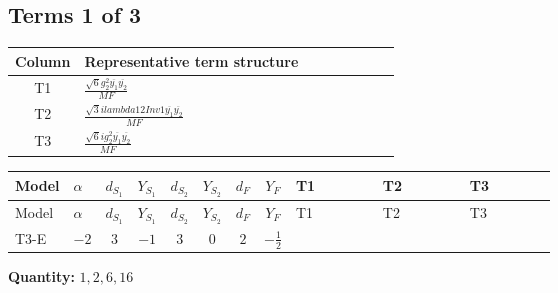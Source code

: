 \documentclass[8pt]{article}
\begin{document}
\begin{landscape}
\subsection*{Terms 1 of 3}
\begin{center}
\begin{tabular}{@{}c >{\raggedright\arraybackslash}p{0.82\linewidth}@{}}
\toprule
Column & Representative term structure \\
\midrule
T1 & \(\displaystyle \frac{\sqrt{6} g_{2}^{2} \overline{y_{1}} \overline{y_{2}}}{MF}\) \\
\midrule
T2 & \(\displaystyle \frac{\sqrt{3} i lambda12Inv1 \overline{y_{1}} \overline{y_{2}}}{MF}\) \\
\midrule
T3 & \(\displaystyle \frac{\sqrt{6} i g_{2}^{2} \overline{y_{1}} \overline{y_{2}}}{MF}\) \\
\midrule
\bottomrule
\end{tabular}
\end{center}
\smallskip
\tiny
\begin{longtable}{@{}llcccccc >{\raggedright\arraybackslash}p{0.21\linewidth} >{\raggedright\arraybackslash}p{0.21\linewidth} >{\raggedright\arraybackslash}p{0.21\linewidth}@{}}
\toprule
Model & $\alpha$ & $d_{S_1}$ & $Y_{S_1}$ & $d_{S_2}$ & $Y_{S_2}$ & $d_F$ & $Y_F$ & T1 & T2 & T3 \\
\midrule
\endfirsthead
\toprule
Model & $\alpha$ & $d_{S_1}$ & $Y_{S_1}$ & $d_{S_2}$ & $Y_{S_2}$ & $d_F$ & $Y_F$ & T1 & T2 & T3 \\
\midrule
\endhead
T3-E & $-2$ & $3$ & $-1$ & $3$ & $0$ & $2$ & $-\frac{1}{2}$ & \scriptsize\adjustbox{max width=\linewidth}{$\begin{gathered} - \frac{\sqrt{6} g_{2}^{2} \overline{y_{1}} \overline{y_{2}}}{6 MF}\end{gathered}$} & \scriptsize\adjustbox{max width=\linewidth}{$\begin{gathered} - \frac{\sqrt{3} i lambda12Inv1 \overline{y_{1}} \overline{y_{2}}}{6 MF}\end{gathered}$} & \scriptsize\adjustbox{max width=\linewidth}{$\begin{gathered} \frac{\sqrt{6} i g_{2}^{2} \overline{y_{1}} \overline{y_{2}}}{6 MF}\end{gathered}$} \\
\midrule
\bottomrule
\end{longtable}
\clearpage
\noindent\textbf{Quantity: }$\mathrm{1,2,6,16}$\par\smallskip

\end{landscape}
\end{document}
